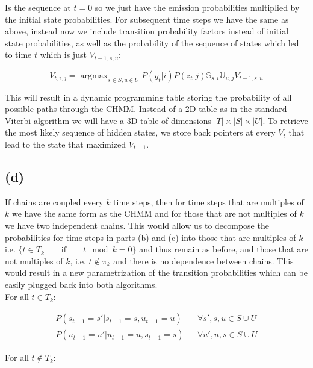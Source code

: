 \documentclass[11pt]{amsart}
\DeclareMathOperator*{\argmax}{argmax}
\begin{document}
Is the sequence at $t=0$ so we just have the emission probabilities multiplied by the initial state probabilities. For subsequent time steps we have the same as above, instead now we include transition probability factors instead of initial state probabilities, as well as the probability of the sequence of states which led to time $t$ which is just $V_{t-1, s, u}$:

\begin{equation}
V_{t, i, j} = \argmax_{s \in S, u \in U} P(y_t \vert i) P(z_t \vert j) \mathbb{S}_{s, i} \mathbb{U}_{u, j} V_{t-1, s, u}
\end{equation}

This will result in a dynamic programming table storing the probability of all possible paths through the CHMM. Instead of a 2D table as in the standard Viterbi algorithm we will have a 3D table of dimensions $|T| \times |S| \times |U|$. To retrieve the most likely sequence of hidden states, we store back pointers at every $V_t$ that lead to the state that maximized $V_{t-1}$. 

\subsection{(d)}

If chains are coupled every $k$ time steps, then for time steps that are multiples of $k$ we have the same form as the CHMM and for those that are not multiples of $k$ we have two independent chains. This would allow us to decompose the probabilities for time steps in parts (b) and (c) into those that are multiples of $k$ i.e. $\{ t \in T_{k} \qquad \text{if} \qquad t \mod k = 0 \}$  and thus remain as before, and those that are not multiples of $k$, i.e. $t \notin \pi_k$ and there is no dependence between chains. This would result in a new parametrization of the transition probabilities which can be easily plugged back into both algorithms. \\


For all $t \in T_k$:

\begin{equation}
\begin{aligned}
P(s_{t+1} = s' \vert s_{t-1} = s, u_{t-1} = u) && \forall s', s, u \in S \cup U\\
P(u_{t+1} = u' \vert u_{t-1} = u, s_{t-1} = s) && \forall u', u, s \in S \cup U
\end{aligned}
\end{equation}

For all $t \notin T_k$:
\end{document}
